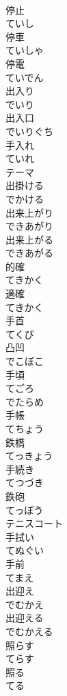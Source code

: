 \documentclass[8pt]{extreport}
\begin{document}
\begin{CJK}{UTF8}{min}
\\	停止 
\\	ていし	
\\	停車 
\\	ていしゃ	
\\	停電 
\\	ていでん	
\\	出入り 
\\	でいり	
\\	出入口 
\\	でいりぐち	
\\	手入れ 
\\	ていれ	
\\	テーマ	
\\	出掛ける 
\\	でかける	
\\	出来上がり 
\\	できあがり	
\\	出来上がる 
\\	できあがる	
\\	的確 
\\	てきかく	
\\	適確 
\\	てきかく	
\\	手首 
\\	てくび	
\\	凸凹 
\\	でこぼこ	
\\	手頃 
\\	てごろ	
\\	でたらめ	
\\	手帳 
\\	てちょう	
\\	鉄橋 
\\	てっきょう	
\\	手続き 
\\	てつづき	
\\	鉄砲 
\\	てっぽう	
\\	テニスコート	
\\	手拭い 
\\	てぬぐい	
\\	手前 
\\	てまえ	
\\	出迎え 
\\	でむかえ	
\\	出迎える 
\\	でむかえる	
\\	照らす 
\\	てらす	
\\	照る 
\\	てる	

\end{CJK}
\end{document}
